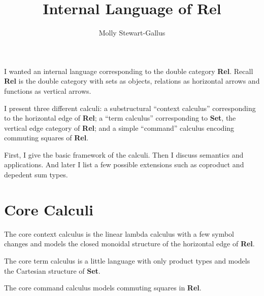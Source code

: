 \documentclass{scrartcl}
\newcommand{\Rel}{\textbf{Rel}}
\newcommand{\Set}{\textbf{Set}}
\begin{document}
\title{Internal Language of Rel}
\author{Molly Stewart-Gallus}

\maketitle

I wanted an internal language corresponding to the double category
\Rel{}. Recall \Rel{} is the double category with sets as objects,
relations as horizontal arrows and functions as vertical arrows.

I present three different calculi: a substructural ``context
calculus'' corresponding to the horizontal edge of \Rel{}; a ``term
calculus'' corresponding to \Set{}, the vertical edge category of
\Rel{}; and a simple ``command'' calculus encoding commuting squares
of \Rel{}.

First, I give the basic framework of the calculi. Then I discuss
semantics and applications. And later I list a few possible extensions
such as coproduct and depedent sum types.

\section*{Core Calculi}

The core context calculus is the linear lambda calculus with a few
symbol changes and models the closed monoidal structure of the
horizontal edge of \Rel{}.

The core term calculus is a little language with only product types
and models the Cartesian structure of \Set{}.

The core command calculus models commuting squares in \Rel{}.
\end{document}
